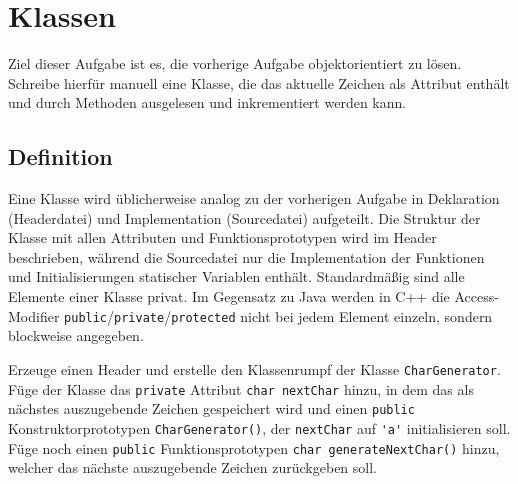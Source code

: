 \section{\ExercisePrefixBasics Klassen}
Ziel dieser Aufgabe ist es, die vorherige Aufgabe objektorientiert zu lösen. Schreibe hierfür manuell eine Klasse, die das aktuelle Zeichen als Attribut enthält und durch Methoden ausgelesen und inkrementiert werden kann.


\subsection{Definition}
Eine Klasse wird üblicherweise analog zu der vorherigen Aufgabe in Deklaration (Headerdatei) und Implementation (Sourcedatei) aufgeteilt.
Die Struktur der Klasse mit allen Attributen und Funktionsprototypen wird im Header beschrieben, während die Sourcedatei nur die Implementation der Funktionen und Initialisierungen statischer Variablen enthält.
Standardmäßig sind alle Elemente einer Klasse privat.
Im Gegensatz zu Java werden in C++ die Access-Modifier \lstinline{public}/\lstinline{private}/\lstinline{protected} nicht bei jedem Element einzeln, sondern blockweise angegeben.


Erzeuge einen Header  und erstelle den Klassenrumpf der Klasse \lstinline{CharGenerator}.
Füge der Klasse das \lstinline{private} Attribut \lstinline{char nextChar} hinzu, in dem das als nächstes auszugebende Zeichen gespeichert wird und einen \lstinline{public} Konstruktorprototypen \lstinline{CharGenerator()}, der \lstinline{nextChar} auf \lstinline{'a'} initialisieren soll.
Füge noch einen \lstinline{public} Funktionsprototypen \lstinline{char generateNextChar()} hinzu, welcher das nächste auszugebende Zeichen zurückgeben soll.




